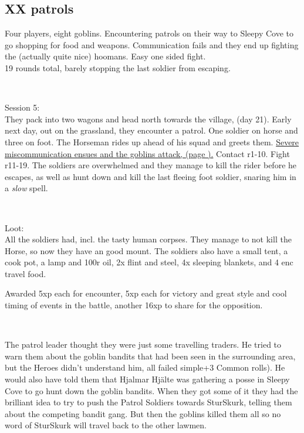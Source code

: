 \subsection*{XX patrols} 

Four players, eight goblins. Encountering patrols on their way to Sleepy Cove to go shopping for food and weapons. Communication fails and they end up fighting the (actually quite nice) hoomans. Easy one sided fight.\\
19 rounds total, barely stopping the last soldier from escaping.

\

Session 5:\\                                                            %
They pack into two wagons and head north towards the village, (day 21). Early next day, out on the grassland, they encounter a patrol. One soldier on horse and three on foot. The Horseman rides up ahead of his squad and greets them. \hyperref[misunderstandings]{Severe miscommunication ensues and the goblins attack, (page \pageref{misunderstandings}).} Contact r1-10. Fight r11-19. The soldiers are overwhelmed and they manage to kill the rider before he escapes, as well as hunt down and kill the last fleeing foot soldier, snaring him in a \emph{slow} spell.

\

Loot:\\
All the soldiers had, incl. the tasty human corpses. They manage to not kill the Horse, so now they have an good mount. The soldiers also have a small tent, a cook pot, a lamp and 100r oil, 2x flint and steel, 4x sleeping blankets, and 4 enc travel food.

Awarded 5xp each for encounter, 5xp each for victory and great style and cool timing of events in the battle, another 16xp to share for the opposition.

\

The patrol leader thought they were just some travelling traders. He tried to warn them about the goblin bandits that had been seen in the surrounding area, but the Heroes didn't understand him, all failed simple+3 Common rolls). He would also have told them that Hjalmar Hjälte was gathering a posse in Sleepy Cove to go hunt down the goblin bandits. When they got some of it they had the brilliant idea to try to push the Patrol Soldiers towards SturSkurk, telling them about the competing bandit gang. But then the goblins killed them all so no word of SturSkurk will travel back to the other lawmen.

